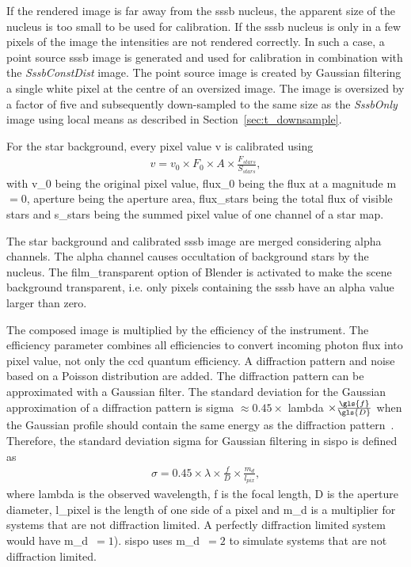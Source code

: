 If the rendered image is far away from the \gls{sssb} nucleus, the apparent size of the nucleus is too small to be used for calibration. If the \gls{sssb} nucleus is only in a few pixels of the image the intensities are not rendered correctly. In such a case, a point source \gls{sssb} image is generated and used for calibration in combination with the \textit{SssbConstDist} image. The point source image is created by Gaussian filtering a single white pixel at the centre of an oversized image. The image is oversized by a factor of five and subsequently down-sampled to the same size as the \textit{SssbOnly} image using local means as described in Section~\ref{sec:t_downsample}.

For the star background, every pixel value \gls{v} is calibrated using
\begin{align}
        v = v_0 \times F_0 \times A \times \frac{F_{stars}}{S_{stars}}, \label{eq:comp_cal_starmap}
\end{align}
with \gls{v_0} being the original pixel value, \gls{flux_0} being the flux at a magnitude \gls{m}$ = 0$, \gls{aperture} being the aperture area, \gls{flux_stars} being the total flux of visible stars and \gls{s_stars} being the summed pixel value of one channel of a star map.

The star background and calibrated \gls{sssb} image are merged considering alpha channels. The alpha channel causes occultation of background stars by the nucleus. The film\_transparent option of Blender is activated to make the scene background transparent, i.e. only pixels containing the \gls{sssb} have an alpha value larger than zero.

The composed image is multiplied by the efficiency of the instrument. The efficiency parameter combines all efficiencies to convert incoming photon flux into pixel value, not only the \gls{ccd} quantum efficiency. A diffraction pattern and noise based on a Poisson distribution are added. The diffraction pattern can be approximated with a Gaussian filter. The standard deviation for the Gaussian approximation of a diffraction pattern is \gls{sigma} $\approx 0.45 \times$ \gls{lambda} $\times \frac{\gls{f}}{\gls{D}}$ when the Gaussian profile should contain the same energy as the diffraction pattern~\cite{Zhang2007GaussianModels}. Therefore, the standard deviation \gls{sigma} for Gaussian filtering in \gls{sispo} is defined as
\begin{align}
    \sigma = 0.45 \times \lambda \times \frac{f}{D} \times \frac{m_d}{l_{pix}}, \label{eq:comp_sigma}
\end{align}
where \gls{lambda} is the observed wavelength, \gls{f} is the focal length, \gls{D} is the aperture diameter, \gls{l_pixel} is the length of one side of a pixel and \gls{m_d} is a multiplier for systems that are not diffraction limited. A perfectly diffraction limited system would have \gls{m_d}~$= 1$). \Gls{sispo} uses \gls{m_d}~$= 2$ to simulate systems that are not diffraction limited. 

